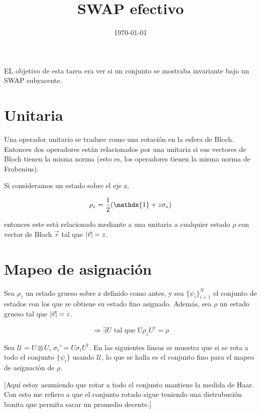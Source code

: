\documentclass[onecolumn,11pt]{article}
\title{SWAP efectivo}
\date{\today}
\newcommand{\mcU}{\mathcal{U}}
\newcommand{\Id}{\mathds{1}}%
\newcommand{\notaAd}[1]{{\color{blue} [#1]}} %
\begin{document}
\maketitle
\thispagestyle{empty}
EL objetivo de esta tarea era ver si un conjunto se mostraba invariante bajo un SWAP subyacente\cite{CGEmergingDynamics}.
\section{Unitaria}

Una operador unitario se traduce como una rotación en la esfera de Bloch. Entonces dos operadores están relacionados por una unitaria si sus vectores de Bloch tienen la misma norma (esto es, los operadores tienen la misma norma de Frobenius).

Si consideramos un estado sobre el eje z,

\begin{equation}
\rho_{z}=\frac{1}{2}\qty(\Id+z\sigma_{z})
\end{equation}

entonces este está relacionado mediante a una unitaria a cualquier estado $\rho$ con vector de Bloch $\vec{r}$ tal que $\abs{\vec{r}}=z$.

\section{Mapeo de asignación}

Sea $\rho_{z}$ un estado grueso sobre z definido como antes, y sea $\{\psi_{i}\}_{i=1}^{N}$ el conjunto de estados con los que se obtiene su estado fino asignado. Además, sea $\rho$ un estado grueso tal que $\abs{\vec{r}}=z$.

\begin{equation}
\Rightarrow \exists U \text{ tal que } U\rho_{z}U^{\dag}=\rho
\end{equation}

Sea $\mcU=U\otimes U$, $\sigma_{i}'=U\sigma_{i}U^{\dag}$. En las siguientes líneas se muestra que si se rota a todo el conjunto $\{\psi_{i}\}$ usando $\mcU$, lo que se halla es el conjunto fino para el mapeo de asignación de $\rho$.

\notaAd{Aquí estoy asumiendo que rotar a todo el conjunto mantiene la medida de Haar. Con esto me refiero a que el conjunto rotado sigue teniendo una distrubución bonita que permita sacar un promedio decente.}
\end{document}
